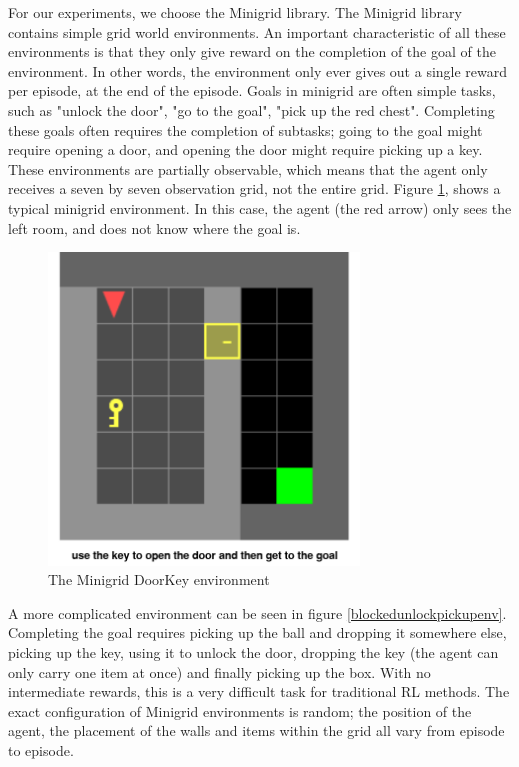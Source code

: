 \documentclass[conference]{IEEEtran}
\begin{document}
For our experiments, we choose the Minigrid library. The Minigrid library contains simple grid world environments. An important characteristic of all these environments is that they only give reward on the completion of the goal of the environment. In other words, the environment only ever gives out a single reward per episode, at the end of the episode. Goals in minigrid are often simple tasks, such as "unlock the door", "go to the goal", "pick up the red chest". Completing these goals often requires the completion of subtasks; going to the goal might require opening a door, and opening the door might require picking up a key. These environments are partially observable, which means that the agent only receives a seven by seven observation grid, not the entire grid. Figure \ref{doorkeyenv}, shows a typical minigrid environment. In this case, the agent (the red arrow) only sees the left room, and does not know where the goal is.

\begin{figure}[h]
\centerline{\includegraphics[width=3.25in]{figure/doorkeyenv.png}}
\caption{The Minigrid DoorKey environment}
\label{doorkeyenv}
\end{figure}

A more complicated environment can be seen in figure \ref{blockedunlockpickupenv}. Completing the goal requires picking up the ball and dropping it somewhere else, picking up the key, using it to unlock the door, dropping the key (the agent can only carry one item at once) and finally picking up the box. With no intermediate rewards, this is a very difficult task for traditional RL methods. The exact configuration of Minigrid environments is random; the position of the agent, the placement of the walls and items within the grid all vary from episode to episode.
\end{document}
